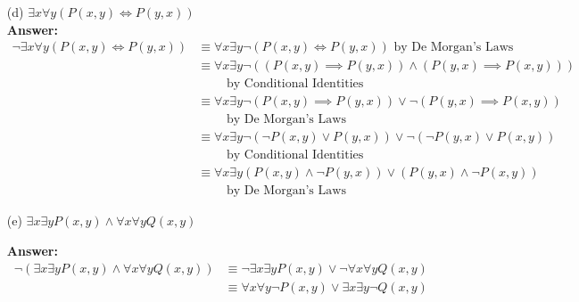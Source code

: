 \documentclass[12pt]{extreport}
\newcommand{\answer}[0]{\medskip \textbf{Answer:} \medskip}
\begin{document}
\begin{enumerate}
\begin{enumerate}
            \item[(d)] \( \exists x \forall y (P(x, y) \iff P(y, x)) \) \\
            
                \answer
                \begin{align*}
                    \neg \exists x \forall y (P(x, y) \iff P(y, x)) &\equiv \forall x \exists y \neg (P(x, y) \iff P(y, x)) \text{ by De Morgan's Laws} \\
                        &\equiv \forall x \exists y \neg ((P(x, y) \implies P(y, x)) \land (P(y, x) \implies P(x, y))) \\
                        & \qquad \text{ by Conditional Identities} \\
                        &\equiv \forall x \exists y \neg (P(x, y) \implies P(y, x)) \lor \neg (P(y, x) \implies P(x, y)) \\
                        & \qquad \text{ by De Morgan's Laws} \\
                        &\equiv \forall x \exists y \neg (\neg P(x, y) \lor P(y, x)) \lor \neg (\neg P(y, x) \lor P(x, y)) \\
                        & \qquad \text{ by Conditional Identities} \\
                        &\equiv \forall x \exists y (P(x, y) \land \neg P(y, x)) \lor (P(y, x) \land \neg P(x, y)) \\
                        & \qquad \text{ by De Morgan's Laws}
                \end{align*}

            \item[(e)] \( \exists x \exists y P(x, y) \land \forall x \forall y Q(x, y) \)
            
                \answer
                \begin{align*}
                    \neg (\exists x \exists y P(x, y) \land \forall x \forall y Q(x, y)) &\equiv \neg \exists x \exists y P(x, y) \lor \neg \forall x \forall y Q(x, y) \\
                        &\equiv \forall x \forall y \neg P(x, y) \lor \exists x \exists y \neg Q(x, y) 
                \end{align*}

        \end{enumerate}
        
\end{enumerate}
\end{document}
